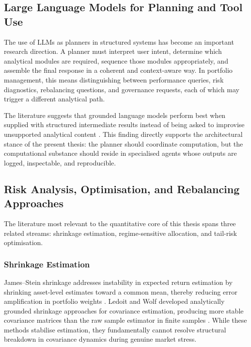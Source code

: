 \documentclass[11pt]{article}
\begin{document}
\subsection{Large Language Models for Planning and Tool Use}
The use of LLMs as planners in structured systems has become an important research direction. A planner must interpret user intent, determine which analytical modules are required, sequence those modules appropriately, and assemble the final response in a coherent and context-aware way. In portfolio management, this means distinguishing between performance queries, risk diagnostics, rebalancing questions, and governance requests, each of which may trigger a different analytical path.

The literature suggests that grounded language models perform best when supplied with structured intermediate results instead of being asked to improvise unsupported analytical content \cite{wu2023,li2023}. This finding directly supports the architectural stance of the present thesis: the planner should coordinate computation, but the computational substance should reside in specialised agents whose outputs are logged, inspectable, and reproducible.

\subsection{Risk Analysis, Optimisation, and Rebalancing Approaches}
The literature most relevant to the quantitative core of this thesis spans three related streams: shrinkage estimation, regime-sensitive allocation, and tail-risk optimisation.

\subsubsection{Shrinkage Estimation}
James--Stein shrinkage addresses instability in expected return estimation by shrinking asset-level estimates toward a common mean, thereby reducing error amplification in portfolio weights \cite{james1961,jorion1986}. Ledoit and Wolf developed analytically grounded shrinkage approaches for covariance estimation, producing more stable covariance matrices than the raw sample estimator in finite samples \cite{ledoit2004a,ledoit2004b,ledoit2017}. While these methods stabilise estimation, they fundamentally cannot resolve structural breakdown in covariance dynamics during genuine market stress.
\end{document}
